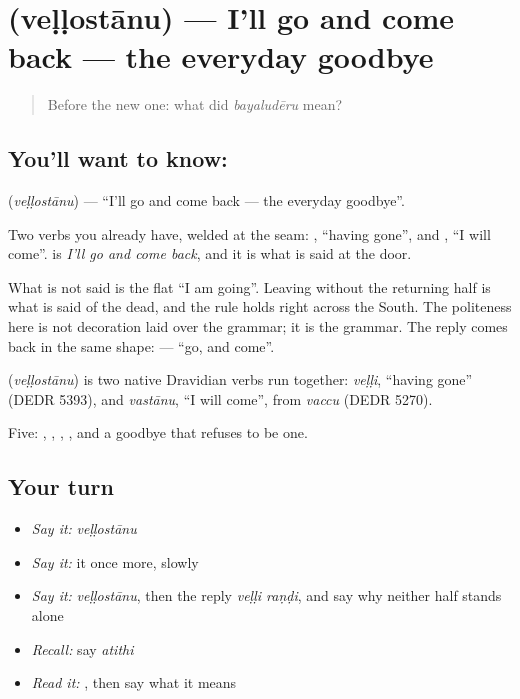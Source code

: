 \section[\texorpdfstring{\te{వెళ్ళొస్తాను} (veḷḷostānu)}{వెళ్ళొస్తాను (veḷḷostānu)}]{ (veḷḷostānu) — I'll go and come back --- the everyday goodbye}

\label{lesson:TE-C50-farewell}



\begin{quote}
Before the new one: what did \emph{bayaludēru} mean?
\end{quote}

\subsection*{You'll want to know: }
\textbf{} (\emph{veḷḷostānu}) — \textquotedblleft{}I'll go and come back --- the everyday goodbye\textquotedblright{}.

Two verbs you already have, welded at the seam: , \textquotedblleft{}having gone\textquotedblright{}, and , \textquotedblleft{}I will come\textquotedblright{}.  is \emph{I'll go and come back}, and it is what is said at the door.

What is not said is the flat \textquotedblleft{}I am going\textquotedblright{}. Leaving without the returning half is what is said of the dead, and the rule holds right across the South. The politeness here is not decoration laid over the grammar; it is the grammar. The reply comes back in the same shape:   — \textquotedblleft{}go, and come\textquotedblright{}.

\begin{cousinweb}
\textbf{} (\emph{veḷḷostānu}) is two native Dravidian verbs run together: \emph{veḷḷi}, \textquotedblleft{}having gone\textquotedblright{} (DEDR 5393), and \emph{vastānu}, \textquotedblleft{}I will come\textquotedblright{}, from \emph{vaccu} (DEDR 5270).
\end{cousinweb}

\begin{grammarlens}[title={What you've built}]
Five: , , , , and a goodbye that refuses to be one.
\end{grammarlens}

\subsection*{Your turn}
\begin{itemize}
\raggedright
  \item \emph{Say it:} \emph{veḷḷostānu}
  \item \emph{Say it:} it once more, slowly
  \item \emph{Say it:} \emph{veḷḷostānu}, then the reply \emph{veḷḷi raṇḍi}, and say why neither half stands alone
  \item \emph{Recall:} say \emph{atithi}
  \item \emph{Read it:} \textbf{}, then say what it means
\end{itemize}

